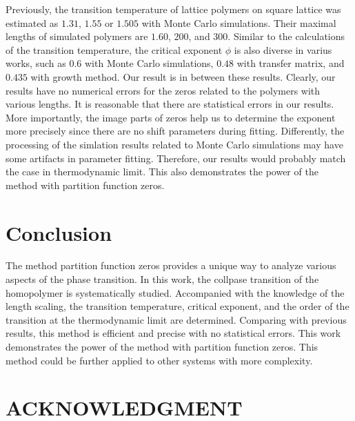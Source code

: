 \documentclass[preprint,preprintnumbers,amsmath,amssymb,showpacs,aps,pre]{revtex4-1}
\begin{document}
Previously, the transition temperature of lattice polymers on square lattice
was estimated as $1.31$\cite{JP82}, $1.55$\cite{BirshteinPolymer85} or
$1.505$\cite{OYJCP08} with Monte Carlo simulations. Their maximal lengths of
simulated polymers are $1.60$, $200$, and $300$. Similar to the calculations
of the transition temperature, the critical exponent $\phi$ is also diverse in
varius works, such as $0.6$\cite{BirshteinPolymer85} with Monte Carlo
simulations, $0.48$\cite{SaleurJSP86} with transfer matrix, and
$0.435$\cite{HeegerJP95} with growth method. Our result is in between
these results. Clearly, our results have no numerical errors for the zeros
related to the polymers with various lengths. It is reasonable that there are
statistical errors in our results. More importantly, the image parts of zeros
help us to determine the exponent more precisely since there are no shift
parameters during fitting. Differently, the processing of the simlation
results related to Monte Carlo simulations may have some artifacts in
parameter fitting. Therefore, our results would probably match the
case in thermodynamic limit. This also demonstrates the power of the method
with partition function zeros.

\section{Conclusion}

The method partition function zeros provides a unique way to analyze various
aspects of the phase transition. In this work, the collpase transition of the
homopolymer is systematically studied. Accompanied with the knowledge of the
length scaling, the transition temperature, critical exponent, and the order
of the transition at the thermodynamic limit are determined. Comparing with
previous results, this method is efficient and precise with no statistical
errors. This work demonstrates the power of the method with partition function
zeros. This method could be further applied to other systems with more
complexity.

\section*{ACKNOWLEDGMENT}
\end{document}
